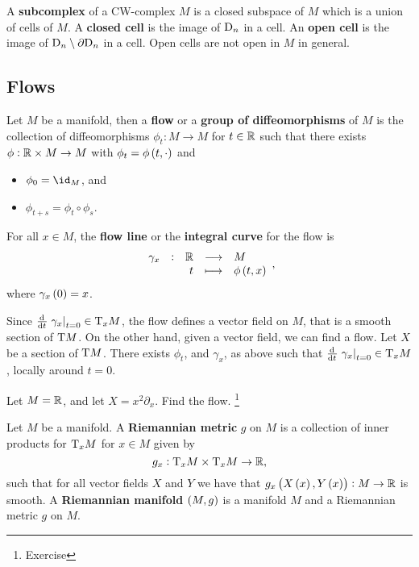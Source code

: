 A \textbf{subcomplex} of a CW-complex $ M $ is a closed subspace of $ M $ which is a union of cells of $ M $. A \textbf{closed cell} is the image of $ \mathrm{D}_n $ in a cell. An \textbf{open cell} is the image of $ \mathrm{D}_n \setminus \partial\mathrm{D}_n $ in a cell. Open cells are not open in $ M $ in general.

\pagebreak

\subsection{Flows}


\begin{definition}
Let $ M $ be a manifold, then a \textbf{flow} or a \textbf{group of diffeomorphisms} of $ M $ is the collection of diffeomorphisms $ \phi_t : M \to M $ for $ t \in \mathbb{R} $ such that there exists $ \phi : \mathbb{R} \times M \to M $ with $ \phi_t = \phi\br{t, \cdot} $ and
\begin{itemize}
\item $ \phi_0 = \id_M $, and
\item $ \phi_{t + s} = \phi_t \circ \phi_s $.
\end{itemize}
For all $ x \in M $, the \textbf{flow line} or the \textbf{integral curve} for the flow is
$$ \function[\gamma_x]{\RR}{M}{t}{\phi\br{t, x}}, $$
where $ \gamma_x\br{0} = x $.
\end{definition}

Since $ \tod{}{t}\eval{\gamma_x}_{t = 0} \in \T_xM $, the flow defines a vector field on $ M $, that is a smooth section of $ \mathrm{T} M $. On the other hand, given a vector field, we can find a flow. Let $ X $ be a section of $ \mathrm{T} M $. There exists $ \phi_t $, and $ \gamma_x $, as above such that $ \tod{}{t}\eval{\gamma_x}_{t = 0} \in \T_xM $, locally around $ t = 0 $.

\begin{example}
Let $ M = \mathbb{R} $, and let $ X = x^2\partial_x $. Find the flow. \footnote{Exercise}
\end{example}

\begin{definition}
Let $ M $ be a manifold. A \textbf{Riemannian metric} $ g $ on $ M $ is a collection of inner products for $ \mathrm{T}_xM $ for $ x \in M $ given by
$$ g_x : \mathrm{T}_xM \times \mathrm{T}_xM \to \mathbb{R}, $$
such that for all vector fields $ X $ and $ Y $ we have that $ g_x\br{X\br{x}, Y\br{x}} : M \to \RR $ is smooth. A \textbf{Riemannian manifold} $ \br{M, g} $ is a manifold $ M $ and a Riemannian metric $ g $ on $ M $.
\end{definition}

